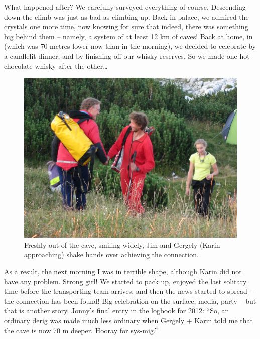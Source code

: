 What happened after? We carefully surveyed everything of course.
Descending down the  climb was just as bad as climbing up.
Back in  palace, we admired the crystals one more time,
now knowing for sure that indeed, there was something big behind them --
namely, a system of at least 12 km of caves! Back at home, in
 (which was 70 metres lower now than in the morning), we
decided to celebrate by a candlelit dinner, and by finishing off our
whisky reserves. So we made one hot chocolate whisky after the
other\ldots{}


\begin{figure}[t!]
\checkoddpage \ifoddpage \forcerectofloat \else \forceversofloat \fi
   \centering
\includegraphics[width = \textwidth]{2012/sanje_za_duso/2012-08-14-1852-JanaCarga-360--orig.jpg}
\caption{Freshly out of the cave, smiling widely, Jim and Gergely (Karin approaching) shake hands over achieving the connection. } \label{connection handshake 1}
\end{figure}

As a result, the next morning I was in terrible shape,
although Karin did not have any problem. Strong girl! We started to pack
up, enjoyed the last solitary time before the transporting team arrives,
and then the news started to spread -- the connection has been found!
Big celebration on the surface, media, party -- but that is another
story. Jonny's final entry in the logbook for 2012: ``So, an ordinary
derig was made much less ordinary when Gergely + Karin told me that the
cave is now 70 m deeper. Hooray for sys-mig.''

